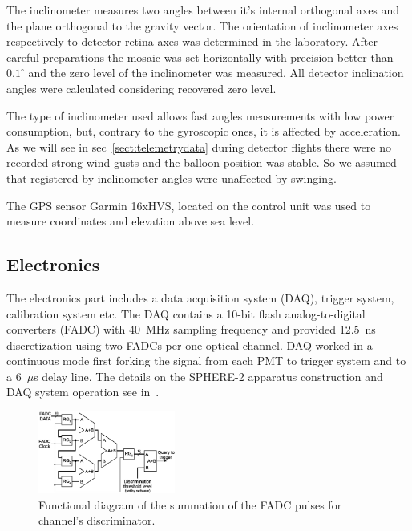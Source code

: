 \documentclass[final,5p,times,twocolumn]{elsarticle}
\begin{document}
The inclinometer measures two angles between it's internal orthogonal axes and the plane orthogonal to the gravity vector. The orientation of inclinometer axes respectively to detector retina axes was determined in the laboratory. After careful preparations the mosaic was set horizontally with precision better than $0.1^\circ$ and the zero level of the inclinometer was measured. All detector inclination angles were calculated considering recovered zero level.

The type of inclinometer used allows fast angles measurements with low power consumption, but, contrary to the gyroscopic ones, it is affected by acceleration. As we will see in sec~\ref{sect:telemetrydata} during detector flights there were no recorded strong wind gusts and the balloon position was stable. So we assumed that  registered by inclinometer angles were unaffected by swinging.

The GPS sensor Garmin 16xHVS, located on the control unit was used to measure coordinates and elevation above sea level.



\subsection{Electronics}
The electronics part includes a data acquisition system (DAQ), trigger system, calibration system etc. The DAQ contains a 10-bit flash analog-to-digital converters (FADC) with 40~MHz sampling frequency and provided 12.5~ns discretization using two \mbox{FADCs} per one optical channel. DAQ worked in a continuous mode first forking the signal from each PMT to trigger system and to a 6~$\mu$s delay line. The details on the \mbox{SPHERE-2} apparatus construction and DAQ system operation see in~\cite{Ant15a}. 

\begin{figure}[tb]
\centering
\includegraphics[width=0.4\textwidth]{figs/int_discr.eps}
\caption{Functional diagram of the summation of the FADC pulses for channel's discriminator.}
\label{fig:int_discr}
\end{figure}
\end{document}
